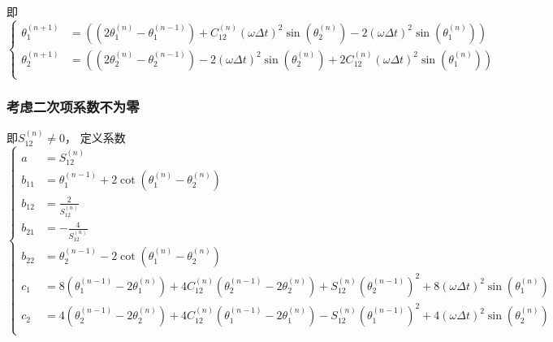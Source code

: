 \documentclass[UTF8]{ctexart}
\begin{document}
				即
				\begin{equation}
					\begin{cases}
						\theta_{1}^{(n + 1)} & = \left(\left(2 \theta_{1}^{(n)} - \theta_{1}^{(n - 1)}\right) +   C_{12}^{(n)} \left(\omega \Delta t\right)^{2} \sin\left(\theta_{2}^{(n)}\right) - 2              \left(\omega \Delta t\right)^{2} \sin\left(\theta_{1}^{(n)}\right)\right)    \\
						\theta_{2}^{(n + 1)} & = \left(\left(2 \theta_{2}^{(n)} - \theta_{2}^{(n - 1)}\right) - 2              \left(\omega \Delta t\right)^{2} \sin\left(\theta_{2}^{(n)}\right) + 2 C_{12}^{(n)} \left(\omega \Delta t\right)^{2} \sin\left(\theta_{1}^{(n)}\right) \right)    \\
					\end{cases}
				\end{equation}

			\newpage

			\subsubsection{考虑二次项系数不为零}
				即$S_{12}^{(n)} \ne 0$， 定义系数
				\begin{equation}
					\begin{cases}
						a           & = S_{12}^{(n)} \\
						b_{11} & = \theta_{1}^{(n-1)} + 2 \cot(\theta_{1}^{(n)} - \theta_2^{(n)}) \\
						b_{12} & =  \frac{2}{S_{12}^{(n)}} \\
						b_{21} & = -\frac{4}{S_{12}^{(n)}} \\
						b_{22} & = \theta_{2}^{(n-1)} - 2 \cot(\theta_{1}^{(n)} - \theta_2^{(n)}) \\
						c_{1}  & = 8 \left(\theta_{1}^{(n - 1)} - 2 \theta_{1}^{(n)}\right) + 4 C_{12}^{(n)} \left(\theta_{2}^{(n - 1)} - 2 \theta_{2}^{(n)}\right) + S_{12}^{(n)} \left(\theta_{2}^{(n - 1)}\right)^2 + 8 \left(\omega \Delta t\right)^{2} \sin\left(\theta_{1}^{(n)}\right)    \\
						c_{2}  & = 4 \left(\theta_{2}^{(n - 1)} - 2 \theta_{2}^{(n)}\right) + 4 C_{12}^{(n)} \left(\theta_{1}^{(n - 1)} - 2 \theta_{1}^{(n)}\right) - S_{12}^{(n)} \left(\theta_{1}^{(n - 1)}\right)^2 + 4 \left(\omega \Delta t\right)^{2} \sin\left(\theta_{2}^{(n)}\right)\\
					\end{cases}
					\label{eq: abc}
				\end{equation}
\end{document}
